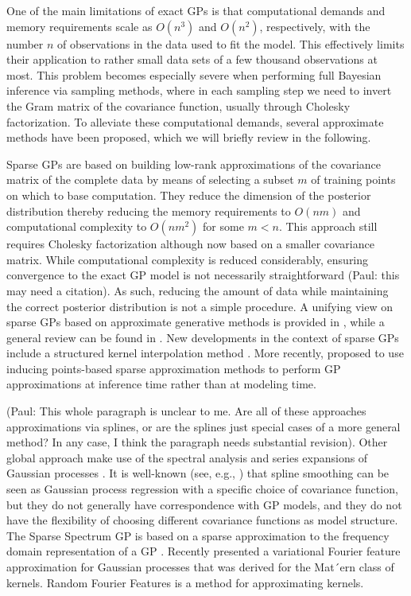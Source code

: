 \documentclass[]{interact}
\theoremstyle{plain}%
\theoremstyle{definition}
\theoremstyle{remark}
\begin{document}
One of the main limitations of exact GPs is that computational demands and memory requirements scale as $O(n^3)$ and $O(n^2)$, respectively, with the number $n$ of observations in the data used to fit the model. This effectively limits their application to rather small data sets of a few thousand observations at most. This problem becomes especially severe when performing full Bayesian inference via sampling methods, where in each sampling step we need to invert the Gram matrix of the covariance function, usually through Cholesky factorization. To alleviate these computational demands, several approximate methods have been proposed, which we will briefly review in the following. 

Sparse GPs are based on building low-rank approximations of the covariance matrix of the complete data by means of selecting a subset $m$ of training points on which to base computation. They reduce the dimension of the posterior distribution thereby reducing the memory requirements to $O(nm)$ and computational complexity to $O(nm^2)$ for some $m < n$. This approach still requires Cholesky factorization although now based on a smaller covariance matrix. While computational complexity is reduced considerably, ensuring convergence to the exact GP model is not necessarily straightforward (Paul: this may need a citation). As such, reducing the amount of data while maintaining the correct posterior distribution is not a simple procedure. A unifying view on sparse GPs based on approximate generative methods is provided in \cite{quinonero2005unifying}, while a general review can be found in \cite{rasmussen2006gaussian}. New developments in the context of sparse GPs include a structured kernel interpolation method \citep{wilson2015kernel}. More recently, \citep{bui2017unifying} proposed to use inducing points-based sparse approximation methods to perform GP approximations at inference time rather than at modeling time.

(Paul: This whole paragraph is unclear to me. Are all of these approaches approximations via splines, or are the splines just special cases of a more general method? In any case, I think the paragraph needs substantial revision). Other global approach make use of the spectral analysis and series expansions of Gaussian processes \citep{loeve1977probability,trees1968detection,adler1981geometry,cramer2013stationary}. It is well-known (see, e.g., \cite{wahba1990spline}) that spline smoothing can be seen as Gaussian process regression with a specific choice of covariance function, but they do not generally have correspondence with GP models, and they do not have the flexibility of choosing different covariance functions as model structure. The Sparse Spectrum GP is based on a sparse approximation to the frequency domain representation of a GP \citep{lazaro2010sparse,quia2010sparse,gal2015improving,gal2015improving}. Recently \citep{hensman2017variational} presented a variational Fourier feature approximation for Gaussian processes that was derived for the Mat´ern class of kernels. Random Fourier Features \citep{rahimi2008random,rahimi2009weighted} is a method for approximating kernels.
\end{document}
